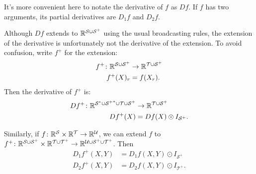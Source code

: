 It's more convenient here to notate the derivative of $f$ as $Df$. If $f$ has two arguments, its partial derivatives are $D_1 f$ and $D_2 f$.

Although $Df$ extends to $\mathbb{R}^{\mathcal{S} \cup \mathcal{S^+}}$ using the usual broadcasting rules, the extension of the derivative is unfortunately not the derivative of the extension. To avoid confusion, write $f^+$ for the extension:
\begin{align*}
  f^+ \colon \mathbb{R}^{\mathcal{S} \cup \mathcal{S^+}} &\rightarrow \mathbb{R}^{\mathcal{T} \cup \mathcal{S^+}} \\
  f^+(X)_r &= f(X_r).
\end{align*}
Then the derivative of $f^+$ is:
\begin{align*}
  Df^+ \colon \mathbb{R}^{\mathcal{S}^* \cup \mathcal{{S^+}}^* \cup \mathcal{T} \cup \mathcal{S^+}} &\rightarrow \mathbb{R}^{\mathcal{T} \cup \mathcal{S^+}} \\
  Df^+(X) &= Df(X) \odot I_{\mathcal{S}^+}.
\end{align*}  

Similarly, if $f \colon \mathbb{R}^\mathcal{S} \times \mathbb{R}^\mathcal{T} \rightarrow \mathbb{R}^\mathcal{U}$, we can extend $f$ to $f^+ \colon \mathbb{R}^\mathcal{S \cup S^+} \times \mathbb{R}^\mathcal{T \cup T^+} \rightarrow \mathbb{R}^\mathcal{U \cup S^+ \cup T^+}$. Then
\begin{align*}
  D_1 f^+(X, Y) &= D_1 f(X, Y) \odot I_{\mathcal{S}^+} \\
  D_2 f^+(X, Y) &= D_2 f(X, Y) \odot I_{\mathcal{T}^+}.
\end{align*}

